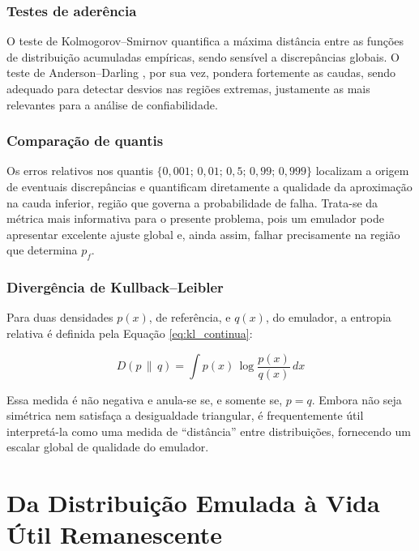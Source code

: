 \subsubsection{Testes de aderência}

O teste de Kolmogorov--Smirnov \cite{massey1951} quantifica a máxima distância entre as funções de distribuição acumuladas empíricas, sendo sensível a discrepâncias globais. O teste de Anderson--Darling \cite{anderson1952, scholz1987}, por sua vez, pondera fortemente as caudas, sendo adequado para detectar desvios nas regiões extremas, justamente as mais relevantes para a análise de confiabilidade.

\subsubsection{Comparação de quantis}

Os erros relativos nos quantis $\{0{,}001;\, 0{,}01;\, 0{,}5;\, 0{,}99;\, 0{,}999\}$ localizam a origem de eventuais discrepâncias e quantificam diretamente a qualidade da aproximação na cauda inferior, região que governa a probabilidade de falha. Trata-se da métrica mais informativa para o presente problema, pois um emulador pode apresentar excelente ajuste global e, ainda assim, falhar precisamente na região que determina $p_f$.

\subsubsection{Divergência de Kullback--Leibler}

Para duas densidades $p(x)$, de referência, e $q(x)$, do emulador, a entropia relativa \cite{kullback1951, cover2006} é definida pela Equação \eqref{eq:kl_continua}:

\begin{equation}\label{eq:kl_continua}
D(p \,\|\, q) = \int p(x)\, \log \frac{p(x)}{q(x)}\, dx
\end{equation}

Essa medida é não negativa e anula-se se, e somente se, $p = q$. Embora não seja simétrica nem satisfaça a desigualdade triangular, é frequentemente útil interpretá-la como uma medida de ``distância'' entre distribuições, fornecendo um escalar global de qualidade do emulador.

\section{Da Distribuição Emulada à Vida Útil Remanescente}
\label{sec:emulador_rul}

